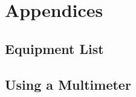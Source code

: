 \documentclass{article}
\theoremstyle{definition}
\theoremstyle{definition}
\theoremstyle{remark}
\begin{document}


\section{Appendices} %
\label{sec:appendices}

  \subsection{Equipment List} %
  \label{sub:equipment_list}
  

  \subsection{Using a Multimeter} %
  \label{sub:using_a_multimeter}
  

\end{document}
